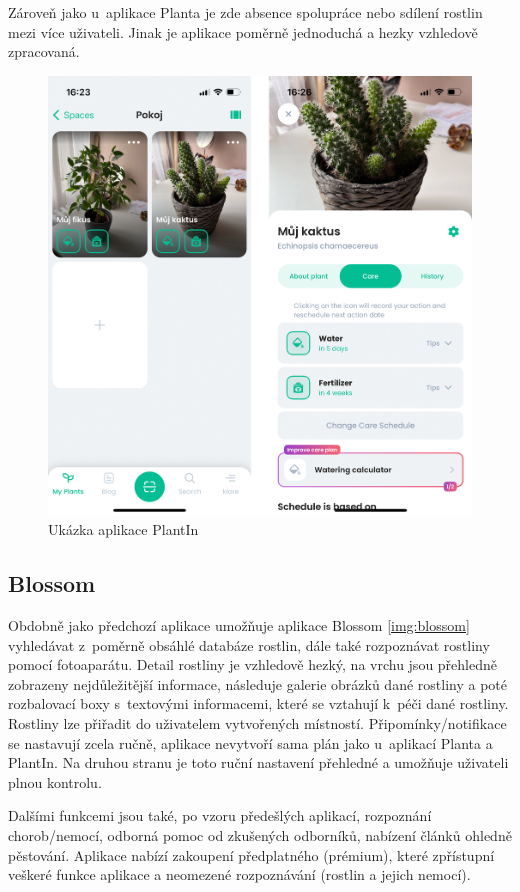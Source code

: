 \documentclass[thesis=M,czech]{FITthesis}[2019/12/23]
\begin{document}
    Zároveň jako u~aplikace Planta je zde absence spolupráce nebo sdílení rostlin mezi více uživateli. Jinak je aplikace poměrně jednoduchá a hezky vzhledově zpracovaná.
    
    \begin{figure}
    	\centering
    	\includegraphics[width=0.75\linewidth]{images/plantin.png}
      	\caption{Ukázka aplikace PlantIn}
      	\label{img:plantin}
    \end{figure}
    
\subsection{Blossom}
    Obdobně jako předchozí aplikace umožňuje aplikace Blossom \ref{img:blossom} vyhledávat z~poměrně obsáhlé databáze rostlin, dále také rozpoznávat rostliny pomocí fotoaparátu. Detail rostliny je vzhledově hezký, na vrchu jsou přehledně zobrazeny nejdůležitější informace, následuje galerie obrázků dané rostliny a poté rozbalovací boxy s~textovými informacemi, které se vztahují k~péči dané rostliny. Rostliny lze přiřadit do uživatelem vytvořených místností. Připomínky/notifikace se nastavují zcela ručně, aplikace nevytvoří sama plán jako u~aplikací Planta a PlantIn. Na druhou stranu je toto ruční nastavení přehledné a umožňuje uživateli plnou kontrolu.
    
    Dalšími funkcemi jsou také, po vzoru předešlých aplikací, rozpoznání chorob/nemocí, odborná pomoc od zkušených odborníků, nabízení článků ohledně pěstování. Aplikace nabízí zakoupení předplatného (prémium), které zpřístupní veškeré funkce aplikace a neomezené rozpoznávání (rostlin a jejich nemocí).
    
\end{document}
